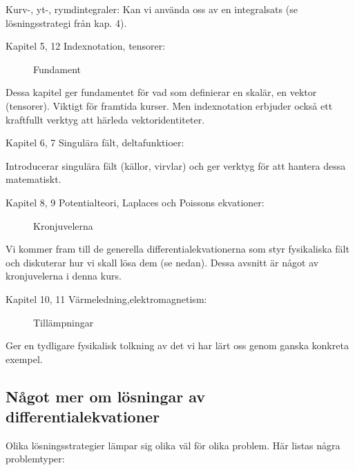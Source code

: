 \documentclass[%
oneside,                 %
final,                   %
10pt]{article}
\begin{document}
\noindent
Kurv-, yt-, rymdintegraler: Kan vi använda oss av en integralsats (se lösningsstrategi från kap. 4).
\begin{description}
 \item[Kapitel 5, 12 Indexnotation, tensorer:] 
   Fundament
\end{description}

\noindent
 Dessa kapitel ger fundamentet för vad som definierar en skalär, 
 en vektor (tensorer). Viktigt för framtida kurser. Men indexnotation 
 erbjuder också ett kraftfullt verktyg att härleda vektoridentiteter.
\begin{description}
 \item[Kapitel 6, 7 Singulära fält, deltafunktioer:] 
\end{description}

\noindent
 Introducerar singulära fält (källor, virvlar) och ger verktyg för 
 att hantera dessa matematiskt.
\begin{description}
 \item[Kapitel 8, 9 Potentialteori, Laplaces och Poissons ekvationer:] 
   Kronjuvelerna
\end{description}

\noindent
 Vi kommer fram till de generella differentialekvationerna som styr fysikaliska 
 fält och diskuterar hur vi skall lösa dem (se nedan). Dessa avsnitt är något 
 av kronjuvelerna i denna kurs.
\begin{description}
 \item[Kapitel 10, 11 Värmeledning,elektromagnetism:] 
   Tillämpningar
\end{description}

\noindent
 Ger en tydligare fysikalisk tolkning av det vi har lärt oss genom ganska konkreta exempel.

\subsection*{Något mer om lösningar av differentialekvationer}
Olika lösningsstrategier lämpar sig olika väl för olika problem. Här listas några problemtyper:
\end{document}
